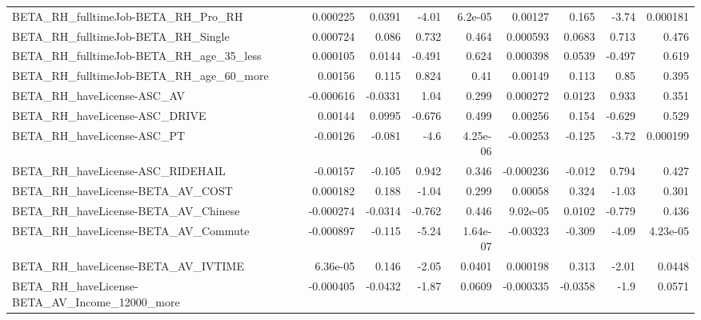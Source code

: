 \begin{tabular}{lrrrrrrrr}
BETA\_RH\_fulltimeJob-BETA\_RH\_Pro\_RH                 &    0.000225 &       0.0391 &    -4.01 &  6.2e-05 &    0.00127 &       0.165 &        -3.74 &      0.000181 \\
BETA\_RH\_fulltimeJob-BETA\_RH\_Single                 &    0.000724 &        0.086 &    0.732 &    0.464 &   0.000593 &      0.0683 &        0.713 &         0.476 \\
BETA\_RH\_fulltimeJob-BETA\_RH\_age\_35\_less            &    0.000105 &       0.0144 &   -0.491 &    0.624 &   0.000398 &      0.0539 &       -0.497 &         0.619 \\
BETA\_RH\_fulltimeJob-BETA\_RH\_age\_60\_more            &     0.00156 &        0.115 &    0.824 &     0.41 &    0.00149 &       0.113 &         0.85 &         0.395 \\
BETA\_RH\_haveLicense-ASC\_AV                         &   -0.000616 &      -0.0331 &     1.04 &    0.299 &   0.000272 &      0.0123 &        0.933 &         0.351 \\
BETA\_RH\_haveLicense-ASC\_DRIVE                      &     0.00144 &       0.0995 &   -0.676 &    0.499 &    0.00256 &       0.154 &       -0.629 &         0.529 \\
BETA\_RH\_haveLicense-ASC\_PT                         &    -0.00126 &       -0.081 &     -4.6 & 4.25e-06 &   -0.00253 &      -0.125 &        -3.72 &      0.000199 \\
BETA\_RH\_haveLicense-ASC\_RIDEHAIL                   &    -0.00157 &       -0.105 &    0.942 &    0.346 &  -0.000236 &      -0.012 &        0.794 &         0.427 \\
BETA\_RH\_haveLicense-BETA\_AV\_COST                   &    0.000182 &        0.188 &    -1.04 &    0.299 &    0.00058 &       0.324 &        -1.03 &         0.301 \\
BETA\_RH\_haveLicense-BETA\_AV\_Chinese                &   -0.000274 &      -0.0314 &   -0.762 &    0.446 &   9.02e-05 &      0.0102 &       -0.779 &         0.436 \\
BETA\_RH\_haveLicense-BETA\_AV\_Commute                &   -0.000897 &       -0.115 &    -5.24 & 1.64e-07 &   -0.00323 &      -0.309 &        -4.09 &      4.23e-05 \\
BETA\_RH\_haveLicense-BETA\_AV\_IVTIME                 &    6.36e-05 &        0.146 &    -2.05 &   0.0401 &   0.000198 &       0.313 &        -2.01 &        0.0448 \\
BETA\_RH\_haveLicense-BETA\_AV\_Income\_12000\_more      &   -0.000405 &      -0.0432 &    -1.87 &   0.0609 &  -0.000335 &     -0.0358 &         -1.9 &        0.0571 \\

\end{tabular}
